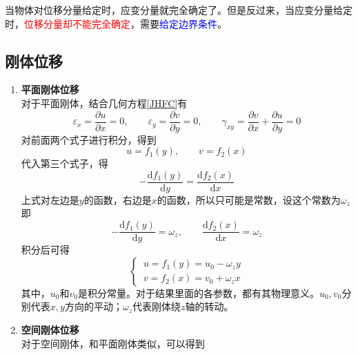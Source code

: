 \documentclass[10pt,a4]{article}
\numberwithin{equation}{section}
\renewcommand{\d}{\text{d}}
\newcommand{\warn}[1][]{
	\vspace*{0.5em}
	\begin{tcolorbox}[colframe=red!75!black, colback=yellow!10!white,title=注意,fonttitle = ]
		#1
\end{tcolorbox}}
\begin{document}
	\warn[\hspace*{1.75em} 当物体对位移分量给定时，应变分量就完全确定了。但是反过来，当应变分量给定时，\textcolor{red}{位移分量却不能完全确定}，需要\textcolor{blue}{给定边界条件}。]
	\vspace*{0.5em}
	
	\subsection{刚体位移}
	\begin{enumerate}
		\item \textbf{平面刚体位移}\\
		\hspace*{1.75em} 对于平面刚体，结合几何方程\eqref{JHFC}有
		\begin{equation*}
			\varepsilon_x = \dfrac{\partial u}{\partial x} = 0, \qquad \varepsilon_y = \dfrac{\partial v}{\partial y} = 0, \qquad \gamma_{xy} = \dfrac{\partial v}{\partial x} + \dfrac{\partial u}{\partial y} = 0
		\end{equation*}
		对前面两个式子进行积分，得到
		\begin{equation*}
			u = f_1 (y), \qquad v = f_2(x)
		\end{equation*}
		代入第三个式子，得
		\begin{equation*}
			- \dfrac{\d f_1(y)}{\d y} = \dfrac{\d f_2(x)}{\d x}
		\end{equation*}
		上式对左边是$y$的函数，右边是$x$的函数，所以只可能是常数，设这个常数为$\omega_z$即
		\begin{equation*}
			- \dfrac{\d f_1(y)}{\d y} = \omega_z, \qquad \dfrac{\d f_2(x)}{\d x} = \omega_z
		\end{equation*}
		积分后可得
		\begin{equation}
			\begin{cases}
				\, u = f_1(y) = u_0 - \omega_z y\\
				\, v = f_2(x) = v_0 + \omega_z x
			\end{cases}
		\end{equation}
		其中，$u_0$和$v_0$是积分常量。对于结果里面的各参数，都有其物理意义。$u_0,v_0$分别代表$x,y$方向的平动；$\omega_z$代表刚体绕$z$轴的转动。
		
		\item \textbf{空间刚体位移}\\
		\hspace*{1.75em} 对于空间刚体，和平面刚体类似，可以得到
	\end{enumerate}
	
\end{document}
